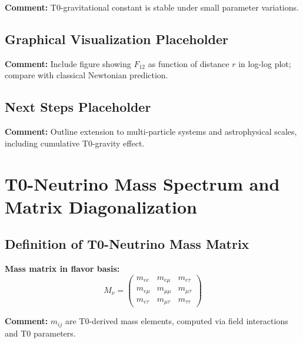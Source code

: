 \documentclass[12pt,a4paper]{article}
\begin{document}
\textbf{Comment:} T0-gravitational constant is stable under small parameter variations.

\subsection{Graphical Visualization Placeholder}

\textbf{Comment:} Include figure showing $F_{12}$ as function of distance $r$ in log-log plot; compare with classical Newtonian prediction.

\subsection{Next Steps Placeholder}

\textbf{Comment:} Outline extension to multi-particle systems and astrophysical scales, including cumulative T0-gravity effect.

\section{T0-Neutrino Mass Spectrum and Matrix Diagonalization}

\subsection{Definition of T0-Neutrino Mass Matrix}

\textbf{Mass matrix in flavor basis:}
\begin{equation}
	M_\nu = 
	\begin{pmatrix}
		m_{ee} & m_{e\mu} & m_{e\tau} \\
		m_{e\mu} & m_{\mu\mu} & m_{\mu\tau} \\
		m_{e\tau} & m_{\mu\tau} & m_{\tau\tau}
	\end{pmatrix}
\end{equation}

\textbf{Comment:} $m_{ij}$ are T0-derived mass elements, computed via field interactions and T0 parameters.
\end{document}
